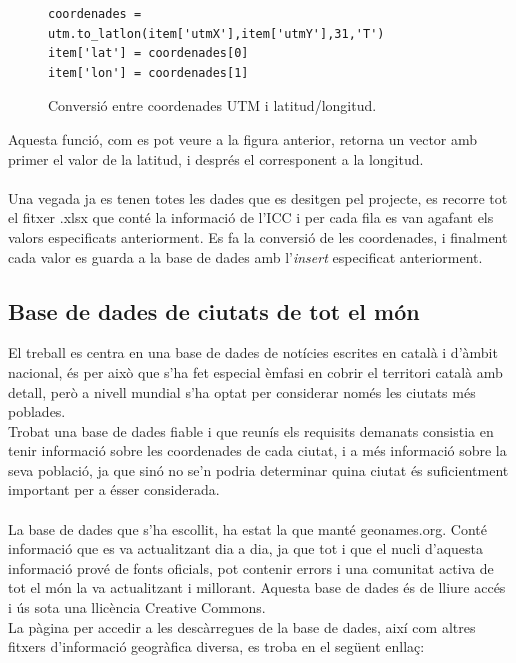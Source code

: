 \documentclass[12pt,a4paper,openright,oneside]{article}
\numberwithin{equation}{section}
\theoremstyle{definition}
\begin{document}
\begin{figure}[!htbp]
\begin{verbatim}
coordenades = utm.to_latlon(item['utmX'],item['utmY'],31,'T')
item['lat'] = coordenades[0]
item['lon'] = coordenades[1]
\end{verbatim}
\caption{Conversió entre coordenades UTM i latitud/longitud.}
\end{figure}
Aquesta funció, com es pot veure a la figura anterior, retorna un vector amb primer el valor de la latitud, i després el corresponent a la longitud.\\ \\
Una vegada ja es tenen totes les dades que es desitgen pel projecte, es recorre tot el fitxer .xlsx que conté la informació de l'ICC i per cada fila es van agafant els valors especificats anteriorment. Es fa la conversió de les coordenades, i finalment cada valor es guarda a la base de dades amb l'\emph{insert} especificat anteriorment.
\newpage
\subsection*{Base de dades de ciutats de tot el món}
El treball es centra en una base de dades de notícies escrites en català i d'àmbit nacional, és per això que s'ha fet especial èmfasi en cobrir el territori català amb detall, però a nivell mundial s'ha optat per considerar només les ciutats més poblades.\\
Trobat una base de dades fiable i que reunís els requisits demanats consistia en tenir informació sobre les coordenades de cada ciutat, i a més informació sobre la seva població, ja que sinó no se'n podria determinar quina ciutat és suficientment important per a ésser considerada.\\ \\
La base de dades que s'ha escollit, ha estat la que manté geonames.org. Conté informació que es va actualitzant dia a dia, ja que tot i que el nucli d'aquesta informació prové de fonts oficials,  pot contenir errors i una comunitat activa de tot el món la va actualitzant i millorant. Aquesta base de dades és de lliure accés i ús sota una llicència Creative Commons.\\
La pàgina per accedir a les descàrregues de la base de dades, així com altres fitxers d'informació geogràfica diversa, es troba en el següent enllaç:
\end{document}
